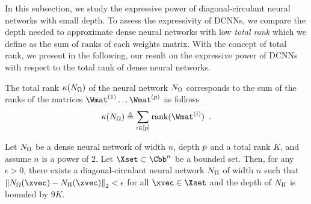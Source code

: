In this subsection, we study the expressive power of diagonal-circulant neural networks with small depth.
To assess the expressivity of DCNNs, we compare the depth needed to approximate dense neural networks with low \emph{total rank} which we define as the sum of ranks of each weights matrix.
With the concept of total rank, we present in the following,  our result on the expressive power of DCNNs with respect to the total rank of dense neural networks.



\begin{definition}
  The total rank $\kappa(N_{\Omega})$ of the neural network $N_{\Omega}$ corresponds to the sum of the ranks of the matrices $\Wmat^{(1)} \ldots \Wmat^{(\depth)}$ as follows
  \begin{align}
    \kappa(\nn_{\Omega}) \triangleq \sum_{i \in [\depth]} \rank(\Wmat^{(i)}) \enspace.
  \end{align}
  \removespace
\end{definition}


\begin{maintheorem} \label{theorem:ch4-low_rank_nn}
  Let $N_\Omega$ be a dense neural network of width $n$, depth $p$ and a total rank $K$, and assume $n$ is a power of $2$.
  Let $\Xset \subset \Cbb^n$ be a bounded set.
  Then, for any $\epsilon > 0$, there exists a diagonal-circulant neural network $N_\Pi$ of width $n$ such that $\norm{\nn_\Omega(\xvec) - \nn_\Pi(\xvec)}_2 < \epsilon$ for all $\xvec \in \Xset$ and the depth of $N_\Pi$ is bounded by $9K$.
\end{maintheorem}


